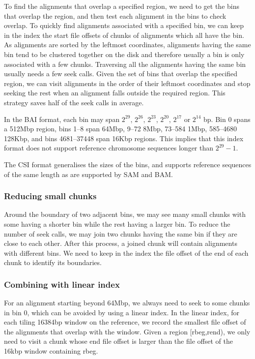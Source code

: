 \documentclass[10pt]{article}
\begin{document}

To find the alignments that overlap a specified region, we need to get
the bins that overlap the region, and then test each alignment in the
bins to check overlap. To quickly find alignments associated with a
specified bin, we can keep in the index the start file offsets of chunks
of alignments which all have the bin. As alignments are sorted by the
leftmost coordinates, alignments having the same bin tend to be
clustered together on the disk and therefore usually a bin is only
associated with a few chunks. Traversing all the alignments having the
same bin usually needs a few seek calls. Given the set of bins that
overlap the specified region, we can visit alignments in the order of
their leftmost coordinates and stop seeking the rest when an alignment
falls outside the required region. This strategy saves half of the seek
calls in average.

In the BAI format, each bin may span $2^{29}$, $2^{26}$, $2^{23}$, $2^{20}$,
$2^{17}$ or $2^{14}$ bp. Bin 0 spans a 512Mbp region, bins 1--8 span 64Mbp,
9--72 8Mbp, 73--584 1Mbp, 585--4680 128Kbp, and bins 4681--37448 span 16Kbp
regions.  This implies that this index format does not support reference
chromosome sequences longer than $2^{29}-1$.

The CSI format generalises the sizes of the bins, and supports reference
sequences of the same length as are supported by SAM and BAM.

\subsubsection{Reducing small chunks}
Around the boundary of two adjacent bins, we may see many small chunks
with some having a shorter bin while the rest having a larger bin. To
reduce the number of seek calls, we may join two chunks having the same
bin if they are close to each other. After this process, a joined chunk
will contain alignments with different bins. We need to keep in the
index the file offset of the end of each chunk to identify its
boundaries.

\subsubsection{Combining with linear index}
For an alignment starting beyond 64Mbp, we always need to seek to some
chunks in bin 0, which can be avoided by using a linear index. In the
linear index, for each tiling 16384bp window on the reference, we record
the smallest file offset of the alignments that overlap with the
window. Given a region [rbeg,rend), we only need to visit a chunk whose
end file offset is larger than the file offset of the 16kbp window
containing rbeg.
\end{document}

